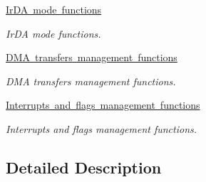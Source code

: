 \begin{DoxyCompactItemize}
\mbox{\hyperlink{group___u_s_a_r_t___group7}{Ir\+D\+A mode functions}}
\begin{DoxyCompactList}\small\item\em Ir\+DA mode functions. \end{DoxyCompactList}\item 
\mbox{\hyperlink{group___u_s_a_r_t___group8}{D\+M\+A transfers management functions}}
\begin{DoxyCompactList}\small\item\em D\+MA transfers management functions. \end{DoxyCompactList}\item 
\mbox{\hyperlink{group___u_s_a_r_t___group9}{Interrupts and flags management functions}}
\begin{DoxyCompactList}\small\item\em Interrupts and flags management functions. \end{DoxyCompactList}\end{DoxyCompactItemize}


\subsection{Detailed Description}
